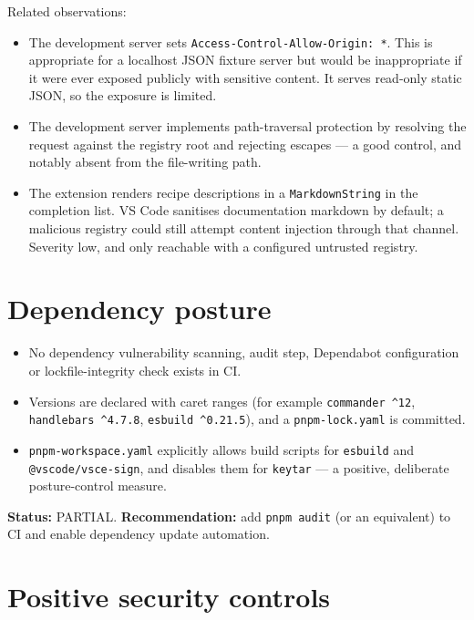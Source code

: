 Related observations:
\begin{itemize}
  \item The development server sets
        \texttt{Access-Control-Allow-Origin: *}. This is appropriate for a
        localhost JSON fixture server but would be inappropriate if it were ever
        exposed publicly with sensitive content. It serves read-only static JSON, so
        the exposure is limited.
  \item The development server implements path-traversal protection by resolving
        the request against the registry root and rejecting escapes --- a good
        control, and notably absent from the file-writing path.
  \item The extension renders recipe descriptions in a
        \texttt{MarkdownString} in the completion list. VS Code sanitises
        documentation markdown by default; a malicious registry could still attempt
        content injection through that channel. Severity low, and only reachable
        with a configured untrusted registry.
\end{itemize}

\section{Dependency posture}

\begin{itemize}
  \item No dependency vulnerability scanning, audit step, Dependabot configuration
        or lockfile-integrity check exists in CI.
  \item Versions are declared with caret ranges (for example \texttt{commander
        \^{}12}, \texttt{handlebars \^{}4.7.8}, \texttt{esbuild \^{}0.21.5}), and a
        \texttt{pnpm-lock.yaml} is committed.
  \item \texttt{pnpm-workspace.yaml} explicitly allows build scripts for
        \texttt{esbuild} and \texttt{@vscode/vsce-sign}, and disables them for
        \texttt{keytar} --- a positive, deliberate posture-control measure.
\end{itemize}

\textbf{Status:} PARTIAL. \textbf{Recommendation:} add \texttt{pnpm audit} (or an
equivalent) to CI and enable dependency update automation.

\section{Positive security controls}

